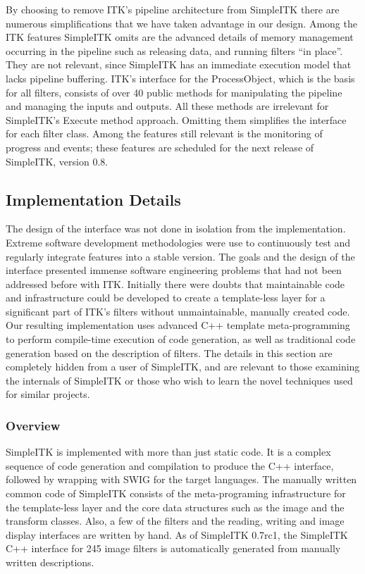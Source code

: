 \documentclass{frontiersMED} %
\begin{document}
By choosing to remove ITK’s pipeline architecture from SimpleITK there
are numerous simplifications that we have taken advantage in our
design. Among the ITK features SimpleITK omits are the advanced
details of memory management occurring in the pipeline such as
releasing data, and running filters “in place”. They are not relevant,
since SimpleITK has an immediate execution model that lacks pipeline
buffering. ITK’s interface for the ProcessObject, which is the basis
for all filters, consists of over 40 public methods for manipulating
the pipeline and managing the inputs and outputs. All these methods
are irrelevant for SimpleITK’s Execute method approach. Omitting them
simplifies the interface for each filter class.  Among the features
still relevant is the monitoring of progress and events; these
features are scheduled for the next release of SimpleITK, version 0.8.

\subsection{Implementation Details}
The design of the interface was not done in isolation from the
implementation. Extreme software development methodologies were use to
continuously test and regularly integrate features into a stable
version.  The goals and the design of the interface presented immense
software engineering problems that had not been addressed before with
ITK. Initially there were doubts that maintainable code and
infrastructure could be developed to create a template-less layer for
a significant part of ITK’s filters without unmaintainable, manually
created code. Our resulting implementation uses advanced C++ template
meta-programming to perform compile-time execution of code generation,
as well as traditional code generation based on the description of
filters. The details in this section are completely hidden from a user
of SimpleITK, and are relevant to those examining the internals of
SimpleITK or those who wish to learn the novel techniques used for
similar projects.

\subsubsection{Overview}
SimpleITK is implemented with more than just static code. It is a
complex sequence of code generation and compilation to produce the C++
interface, followed by wrapping with SWIG for the target
languages. The manually written common code of SimpleITK consists of
the meta-programing infrastructure for the template-less layer and the
core data structures such as the image and the transform
classes. Also, a few of the filters and the reading, writing and image
display interfaces are written by hand. As of SimpleITK 0.7rc1, the
SimpleITK C++ interface for 245 image filters is automatically
generated from manually written descriptions.
\end{document}
